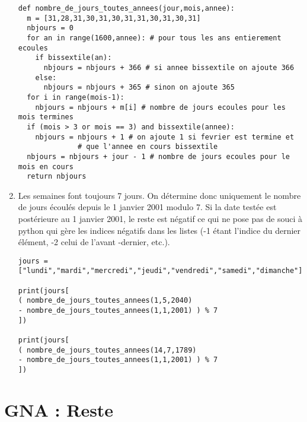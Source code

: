 \begin{solution}
\begin{enumerate}
\begin{verbatim}
def nombre_de_jours_toutes_annees(jour,mois,annee):
  m = [31,28,31,30,31,30,31,31,30,31,30,31]
  nbjours = 0
  for an in range(1600,annee): # pour tous les ans entierement ecoules
    if bissextile(an):
      nbjours = nbjours + 366 # si annee bissextile on ajoute 366
    else:
      nbjours = nbjours + 365 # sinon on ajoute 365
  for i in range(mois-1): 
    nbjours = nbjours + m[i] # nombre de jours ecoules pour les mois termines
  if (mois > 3 or mois == 3) and bissextile(annee):
    nbjours = nbjours + 1 # on ajoute 1 si fevrier est termine et
			  # que l'annee en cours bissextile
  nbjours = nbjours + jour - 1 # nombre de jours ecoules pour le mois en cours
  return nbjours  
\end{verbatim}
 
 \item Les semaines font toujours 7 jours. On détermine donc uniquement le nombre de jours écoulés depuis le 1 janvier 2001 modulo 7. Si la date testée est postérieure au 1 janvier 2001, le reste est négatif ce qui ne pose pas de souci à python qui gère les indices négatifs dans les listes (-1 étant l'indice du dernier élément, -2 celui de l'avant -dernier, etc.).

\begin{verbatim}
jours = ["lundi","mardi","mercredi","jeudi","vendredi","samedi","dimanche"]

print(jours[
( nombre_de_jours_toutes_annees(1,5,2040) 
- nombre_de_jours_toutes_annees(1,1,2001) ) % 7
])

print(jours[
( nombre_de_jours_toutes_annees(14,7,1789) 
- nombre_de_jours_toutes_annees(1,1,2001) ) % 7
])
\end{verbatim}
\end{enumerate}
\end{solution}





















\section{GNA : Reste}


